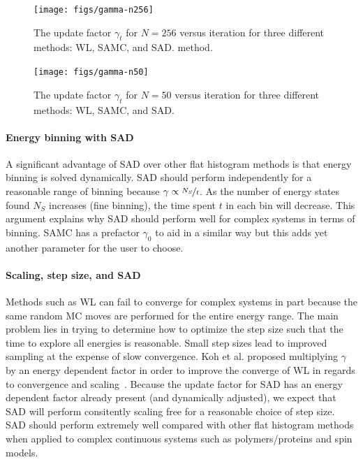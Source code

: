 \documentclass[letterpaper,twocolumn,amsmath,amssymb,pre,aps,10pt]{revtex4-1}
\begin{document}
\begin{figure}
  \texttt{[image: figs/gamma-n256]}
  \caption{The update factor $\gamma_t$ for $N=256$ versus iteration for three
    different methods: WL, SAMC, and SAD.
    method.}\label{fig:gamma-vs-t}
\end{figure}
\begin{figure}
  \texttt{[image: figs/gamma-n50]}
  \caption{The update factor $\gamma_t$ for $N=50$ versus iteration for three
    different methods: WL, SAMC, and SAD.}
\end{figure}

\paragraph{Energy binning with SAD}

A significant advantage of SAD over other flat histogram methods is
that energy binning is solved dynamically. SAD should perform
independently for a reasonable range of binning because $\gamma \propto
\nicefrac{N_S}{t}$.  As the number of energy states found $N_S$
increases (fine binning), the time spent $t$ in each bin will decrease.
This argument explains why SAD should perform well for complex systems
in terms of binning. SAMC has a prefactor $\gamma_0$ to aid in a
similar way but this adds yet another parameter for the user to choose.

\paragraph{Scaling, step size, and SAD}
Methods such as WL can fail to converge for complex systems in part
because the same random MC moves are performed for the entire energy
range.  The main problem lies in trying to determine how to optimize
the step size such that the time to explore all energies is reasonable.
Small step sizes lead to improved sampling at the expense of slow
convergence. Koh et al. proposed multiplying $\gamma$ by an energy
dependent factor in order to improve the converge of WL in regards to
convergence and scaling~\cite{koh2013dynamically}.  Because the update
factor for SAD has an energy dependent factor already present (and
dynamically adjusted), we expect that SAD will perform consitently
scaling free for a reasonable choice of step size.  SAD should perform
extremely well compared with other flat histogram methods when applied
to complex continuous systems such as polymers/proteins and spin models.
\end{document}
